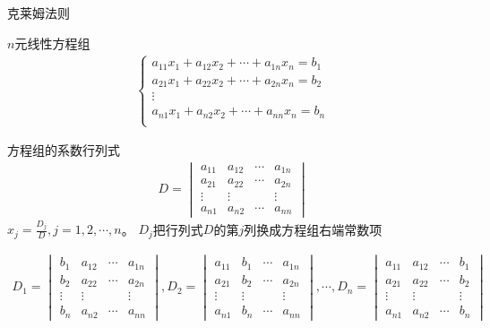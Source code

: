 \documentclass[12pt]{book}
\begin{document}
克莱姆法则


$n$元线性方程组
\begin{gather*}
    \begin{cases}
       a_{11} x_{1} + a_{12} x_{2} + \cdots + a_{1n} x_{n} = b_{1} \\
       a_{21} x_{1} + a_{22} x_{2} + \cdots + a_{2n} x_{n} = b_{2} \\
       \vdots \\
       a_{n1} x_{1} + a_{n2} x_{2} + \cdots + a_{nn} x_{n} = b_{n} \\
    \end{cases}
\end{gather*}

方程组的系数行列式
\begin{gather*}
    D = \begin{vmatrix}
        a_{11} & a_{12} & \cdots & a_{1n} \\
        a_{21} & a_{22} & \cdots & a_{2n} \\
        \vdots & \vdots &        & \vdots \\
        a_{n1} & a_{n2} & \cdots & a_{nn} 
    \end{vmatrix}
\end{gather*}
$x_{j} = \frac{D_j}{D}, j=1,2,\cdots,n$。
$D_j$把行列式$D$的第$j$列换成方程组右端常数项

\begin{gather*}
    D_1 = \begin{vmatrix}
        b_{1}  & a_{12} & \cdots & a_{1n} \\
        b_{2}  & a_{22} & \cdots & a_{2n} \\
        \vdots & \vdots &        & \vdots \\
        b_{n}  & a_{n2} & \cdots & a_{nn} 
    \end{vmatrix},
    D_2 = \begin{vmatrix}
        a_{11} & b_{1}  & \cdots & a_{1n} \\
        a_{21} & b_{2}  & \cdots & a_{2n} \\
        \vdots & \vdots &        & \vdots \\
        a_{n1} & b_{n}  & \cdots & a_{nn} 
    \end{vmatrix},
    \cdots ,
    D_n = \begin{vmatrix}
        a_{11} & a_{12} & \cdots & b_{1}  \\
        a_{21} & a_{22} & \cdots & b_{2}  \\
        \vdots & \vdots &        & \vdots \\
        a_{n1} & a_{n2} & \cdots & b_{n}  
    \end{vmatrix}
\end{gather*}
\end{document}
